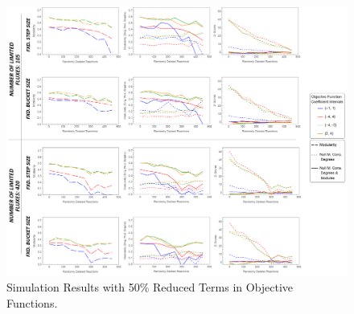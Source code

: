 \begin{landscape}
	\begin{figure}[ht]
		\centering
		\vspace*{-1.5cm}
		\includegraphics[width=1.05\hsize]{../images/supplements-obj_func_terms_reduced50-simulation-results.png}
		\caption{Simulation Results with 50\% Reduced Terms in Objective Functions.}
		\label{figure-supplements-obj_func-terms-reduced50}
	\end{figure}
\end{landscape}